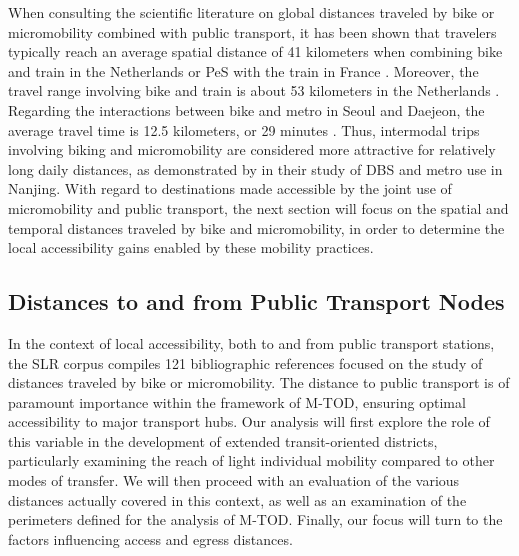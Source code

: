 \begin{refsegment}
When consulting the scientific literature on global distances traveled by bike or micromobility combined with public transport, it has been shown that travelers typically reach an average spatial distance of 41 kilometers when combining bike and train in the Netherlands \textcolor{blue}{\autocite[14]{shelat_analysing_2018}} or \acrshort{PeS} with the train in France \textcolor{blue}{\autocite[186]{moinse_intermodal_2022}}. Moreover, the travel range involving bike and train is about 53 kilometers in the Netherlands \textcolor{blue}{\autocite[225]{keijer_how_2000}}. Regarding the interactions between bike and metro in Seoul and Daejeon, the average travel time is 12.5 kilometers, or 29 minutes \textcolor{blue}{\autocite[46]{lee_strategies_2010}}. Thus, intermodal trips involving biking and micromobility are considered more attractive for relatively long daily distances, as demonstrated by \textcolor{blue}{\textcite[9]{liu_use_2020}} in their study of \acrshort{DBS} and metro use in Nanjing. With regard to destinations made accessible by the joint use of micromobility and public transport, the next section will focus on the spatial and temporal distances traveled by bike and micromobility, in order to determine the local accessibility gains enabled by these mobility practices.%

\subsection{Distances to and from Public Transport Nodes
    \label{chap2:distances-premiers-derniers-km}
    }

In the context of local accessibility, both to and from public transport stations, the \acrshort{SLR} corpus compiles 121 bibliographic references focused on the study of distances traveled by bike or micromobility. The distance to public transport is of paramount importance within the framework of \acrshort{M-TOD}, ensuring optimal accessibility to major transport hubs. Our analysis will first explore the role of this variable in the development of extended transit-oriented districts, particularly examining the reach of light individual mobility compared to other modes of transfer. We will then proceed with an evaluation of the various distances actually covered in this context, as well as an examination of the perimeters defined for the analysis of \acrshort{M-TOD}. Finally, our focus will turn to the factors influencing access and egress distances.%


\end{refsegment}
